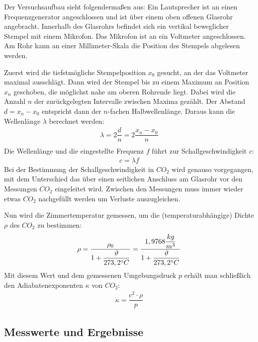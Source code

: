 \documentclass{scrartcl}
\begin{document}
Der Versuchsaufbau sieht folgendermaßen aus: Ein Lautsprecher ist an einen Frequenzgenerator angeschlossen und ist über einem oben offenen Glasrohr angebracht. Innerhalb des Glasrohrs befindet sich ein vertikal beweglicher Stempel mit einem Mikrofon. Das Mikrofon ist an ein Voltmeter angeschlossen. Am Rohr kann an einer Millimeter-Skala die Position des Stempels abgelesen werden.

Zuerst wird die tiefstmögliche Stempelposition $x_{0}$ gesucht, an der das Voltmeter maximal ausschlägt. Dann wird der Stempel bis zu einem Maximum an Position $x_{n}$ geschoben, die möglichst nahe am oberen Rohrende liegt. Dabei wird die Anzahl $n$ der zurückgelegten Intervalle zwischen Maxima gezählt. Der Abstand $d = x_{n} - x_{0}$ entspricht dann der $n$-fachen Halbwellenlänge. Daraus kann die Wellenlänge $\lambda$ berechnet werden:
\begin{align}
\lambda = 2 \dfrac{d}{n} =  2 \dfrac{x_{n}-x_{0}}{n}\\
\end{align}
Die Wellenlänge und die eingestellte Frequenz $f$ führt zur Schallgeschwindigkeit $c$:
\begin{align}
c = \lambda f
\end{align}
Bei der Bestimmung der Schallgeschwindigkeit in $CO_{2}$ wird genauso vorgegangen, mit dem Unterschied das über einen seitlichen Anschluss am Glasrohr vor den Messungen $CO_{2}$ eingeleitet wird. Zwischen den Messungen muss immer wieder etwas $CO_{2}$ nachgefüllt werden um Verluste auszugleichen.

Nun wird die Zimmertemperatur gemessen, um die (temperaturabhängige) Dichte $\rho$ des $CO_{2}$ zu bestimmen:
\begin{align}
\rho = \dfrac{\rho_{0}}{1 + \dfrac{\vartheta}{273,2 \degree C}} = \dfrac{1,9768 \dfrac{kg}{m^3}}{1 + \dfrac{\vartheta}{273,2 \degree C}}
\end{align}
Mit diesem Wert und dem gemessenen Umgebungsdruck $p$ erhält man schließlich den Adiabatenexponenten $\kappa$ von $CO_{2}$:
\begin{align}
\kappa = \dfrac{c^2 \cdot \rho}{p}
\end{align}
\subsection{Messwerte und Ergebnisse}
\end{document}
